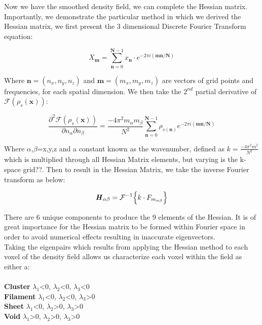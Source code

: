 \documentclass[a4paper,fleqn,usenatbib]{mnras}
\begin{document}
\\
\\
Now we have the smoothed density field, we can complete the Hessian matrix. Importantly, we demonstrate the particular method in which we derived the Hessian matrix, we  first present the 3 dimensional Discrete Fourier Transform equation:
\begin{ceqn}
\begin{equation}
X_{\textbf{m}}=\sum_{\textbf{n}=0}^{\textbf{N}-1}x_{\textbf{n}}\cdot e^{-2\pi i(\textbf{mn}/\textbf{N})}
\label{dft}
\end{equation}
\end{ceqn}
Where $\textbf{n}=(n_{x},n_{y},n_{z})$ and $\textbf{m}=(m_{x},m_{y},m_{z})$ are vectors of grid points and frequencies, for each spatial dimension. We then take the $2^{nd}$ partial derivative of  $\mathcal{F}(\rho_{s}(\textbf{x}))$:

\begin{ceqn}
\begin{equation}
\frac{\partial^{2} \mathcal{F}(\rho_{s}(\textbf{x}))}{\partial n_{\alpha} \partial n_{\beta}}=\frac{-4\pi^{2}m_{\alpha}m_{\beta}}{N^{2}}\sum_{\textbf{n}=0}^{\textbf{N}-1}\rho_{s(\textbf{n})}e^{-2\pi i(\textbf{mn}/\textbf{N})} 
\label{dftdiff}
\end{equation}
\end{ceqn}

Where $\alpha$,$\beta$=x,y,z and a constant known as the wavenumber, defined as $k=\frac{-4\pi^{2}m^{2}}{N^{2}}$ which is multiplied through all Hessian Matrix elements, but varying is the k-space grid??. Then to result in the Hessian Matrix, we take the inverse Fourier transform as below:
\begin{ceqn}
\begin{equation}
\textbf{\textit{H}}_{\alpha \beta}=\mathcal{F}^{-1}\Big\{k\cdot F_{m_{\alpha \beta}}\Big\}
\label{invfouriordtf}
\end{equation}
\end{ceqn}
There are 6 unique components to produce the 9 elements of the Hessian. It is of great importance for the Hessian matrix to be formed within Fourier space in order to avoid numerical effects resulting in inaccurate eigenvectors.
\\
Taking the eigenpairs which results from applying the Hessian method to each voxel of the density field allows us characterize each voxel within the field as either a:
\\
\\
\textbf{Cluster} $\lambda_{1}$<0, $\lambda_{2}$<0, $\lambda_{3}$<0
\\
\textbf{Filament} $\lambda_{1}$<0, $\lambda_{2}$<0, $\lambda_{3}$>0
\\
\textbf{Sheet} $\lambda_{1}$<0, $\lambda_{2}$>0, $\lambda_{3}$>0
\\
\textbf{Void} $\lambda_{1}$>0, $\lambda_{2}$>0, $\lambda_{3}$>0
\\
\end{document}
